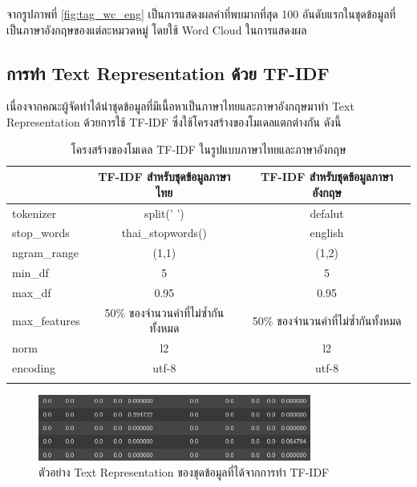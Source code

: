 \documentclass[12pt,oneside,openright,a4paper]{cpe-thai-project}
\begin{document}
\begin{itemize}
        \hspace{1cm}จากรูปภาพที่ \ref{fig:tag_wc_eng} เป็นการแสดงผลคำที่พบมากที่สุด 100 อันดับแรกในชุดข้อมูลที่เป็นภาษาอังกฤษของแต่ละหมวดหมู่ โดยใช้ Word Cloud ในการแสดงผล
        \newpage

    \subsection{การทำ Text Representation ด้วย TF-IDF}
      \hspace{1cm}เนื่องจากคณะผู้จัดทำได้นำชุดข้อมูลที่มีเนื้อหาเป็นภาษาไทยและภาษาอังกฤษมาทำ Text Representation ด้วยการใช้ TF-IDF ซึ่งใช้โครงสร้างของโมเดลแตกต่างกัน ดังนี้ 
      \begin{longtable}[!ht]{lcc}
        \caption{โครงสร้างของโมเดล TF-IDF ในรูปแบบภาษาไทยและภาษาอังกฤษ}\label{tbl:tfidf_feature} \\
        \hhline{===}
        \multicolumn{1}{c}{\textbf{โครงสร้าง}} & \textbf{TF-IDF สำหรับชุดข้อมูลภาษาไทย} & \textbf{TF-IDF สำหรับชุดข้อมูลภาษาอังกฤษ} \\ \hline
        \endhead
        tokenizer     & split(' ')        & defalut      \\ 
        stop\_words   & thai\_stopwords() & english      \\ 
        ngram\_range  & (1,1)             & (1,2)        \\ 
        min\_df       & 5                 & 5            \\ 
        max\_df       & 0.95              & 0.95         \\ 
        max\_features & 50\% ของจำนวนคำที่ไม่ซ้ำกันทั้งหมด             & 50\% ของจำนวนคำที่ไม่ซ้ำกันทั้งหมด       \\ 
        norm          & l2                & l2           \\ 
        encoding      & utf-8             & utf-8        \\ \hhline{===}
      \end{longtable} 
      \begin{figure}[!ht]\centering
        \includegraphics[width=0.8\textwidth]{./img/tfidf_vector.png}
        \caption{ตัวอย่าง Text Representation ของชุดข้อมูลที่ได้จากการทำ TF-IDF}\label{fig:tfidf_vec}

\end{figure}
\end{itemize}
\end{document}
